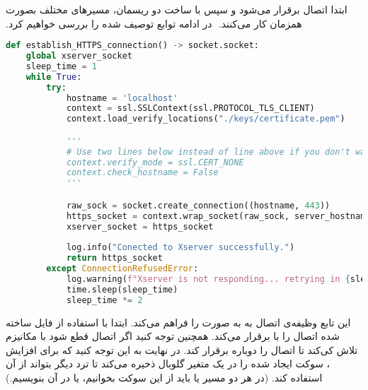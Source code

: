‫ابتدا اتصال  برقرار می‌شود و سپس با ساخت دو ریسمان، مسیرهای مختلف بصورت همزمان کار می‌کنند.
‫
‫در ادامه توابع توصیف شده را بررسی خواهیم کرد.
‫
\begin{latin}
\begin{lstlisting}[firstnumber=14, language=Python]
def establish_HTTPS_connection() -> socket.socket:
    global xserver_socket
    sleep_time = 1
    while True:
        try:
            hostname = 'localhost'
            context = ssl.SSLContext(ssl.PROTOCOL_TLS_CLIENT)
            context.load_verify_locations("./keys/certificate.pem")

            '''
            # Use two lines below instead of line above if you don't want to check self-signed certificate 
            context.verify_mode = ssl.CERT_NONE 
            context.check_hostname = False
            '''

            raw_sock = socket.create_connection((hostname, 443))
            https_socket = context.wrap_socket(raw_sock, server_hostname = Constants.X_SERVER_DOMAIN_NAME)
            xserver_socket = https_socket
        
            log.info("Conected to Xserver successfully.")
            return https_socket
        except ConnectionRefusedError:
            log.warning(f"Xserver is not responding... retrying in {sleep_time}")
            time.sleep(sleep_time)
            sleep_time *= 2
\end{lstlisting}
\end{latin}

‫این تابع وظیفه‌ی اتصال  به  به صورت  را فراهم می‌کند. ابتدا با استفاده از فایل  ساخته شده اتصال  را با  برقرار می‌کند. همچنین توجه کنید اگر اتصال قطع شود با مکانیزم  تلاش کی‌کند تا اتصال را دوباره برقرار کند. در نهایت به این توجه کنید که برای افزایش ، سوکت ایجاد شده را در یک متغیر گلوبال ذخیره می‌کند تا ترد دیگر بتواند از آن استفاده کند. (در هر دو مسیر یا باید از این سوکت بخوانیم، یا در آن بنویسیم.)
‫
‫


